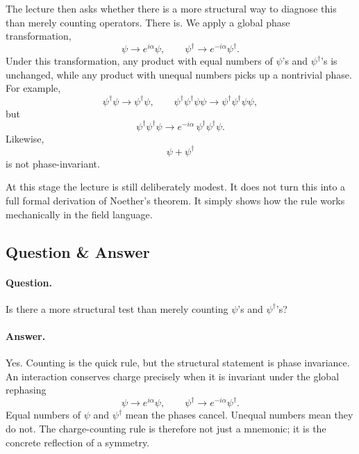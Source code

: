 The lecture then asks whether there is a more structural way to diagnose this than merely counting operators. There is. We apply a global phase transformation,
\begin{equation}
\psi\longrightarrow e^{i\alpha}\psi,
\qquad
\psi^\dagger\longrightarrow e^{-i\alpha}\psi^\dagger.
\end{equation}
Under this transformation, any product with equal numbers of \(\psi\)'s and \(\psi^\dagger\)'s is unchanged, while any product with unequal numbers picks up a nontrivial phase. For example,
\begin{equation}
\psi^\dagger\psi \longrightarrow \psi^\dagger\psi,
\qquad
\psi^\dagger\psi^\dagger\psi\psi \longrightarrow \psi^\dagger\psi^\dagger\psi\psi,
\end{equation}
but
\begin{equation}
\psi^\dagger\psi^\dagger\psi \longrightarrow e^{-i\alpha}\,\psi^\dagger\psi^\dagger\psi.
\end{equation}
Likewise,
\begin{equation}
\psi+\psi^\dagger
\end{equation}
is not phase-invariant.

At this stage the lecture is still deliberately modest. It does not turn this into a full formal derivation of Noether's theorem. It simply shows how the rule works mechanically in the field language.

\subsection{Question \& Answer}

\paragraph{Question.} Is there a more structural test than merely counting \(\psi\)'s and \(\psi^\dagger\)'s?

\paragraph{Answer.} Yes. Counting is the quick rule, but the structural statement is phase invariance. An interaction conserves charge precisely when it is invariant under the global rephasing
\[
\psi\to e^{i\alpha}\psi,
\qquad
\psi^\dagger\to e^{-i\alpha}\psi^\dagger.
\]
Equal numbers of \(\psi\) and \(\psi^\dagger\) mean the phases cancel. Unequal numbers mean they do not. The charge-counting rule is therefore not just a mnemonic; it is the concrete reflection of a symmetry.

